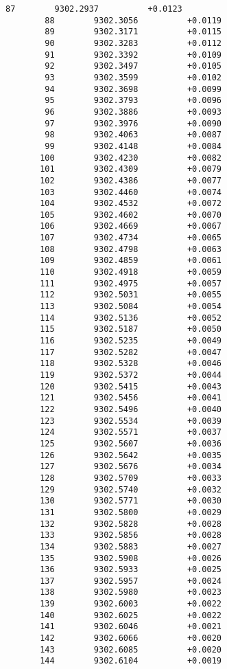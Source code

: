 \documentclass[11pt]{article}
\begin{document}
\begin{Verbatim}[commandchars=\\\{\}]
        87        9302.2937          +0.0123
        88        9302.3056          +0.0119
        89        9302.3171          +0.0115
        90        9302.3283          +0.0112
        91        9302.3392          +0.0109
        92        9302.3497          +0.0105
        93        9302.3599          +0.0102
        94        9302.3698          +0.0099
        95        9302.3793          +0.0096
        96        9302.3886          +0.0093
        97        9302.3976          +0.0090
        98        9302.4063          +0.0087
        99        9302.4148          +0.0084
       100        9302.4230          +0.0082
       101        9302.4309          +0.0079
       102        9302.4386          +0.0077
       103        9302.4460          +0.0074
       104        9302.4532          +0.0072
       105        9302.4602          +0.0070
       106        9302.4669          +0.0067
       107        9302.4734          +0.0065
       108        9302.4798          +0.0063
       109        9302.4859          +0.0061
       110        9302.4918          +0.0059
       111        9302.4975          +0.0057
       112        9302.5031          +0.0055
       113        9302.5084          +0.0054
       114        9302.5136          +0.0052
       115        9302.5187          +0.0050
       116        9302.5235          +0.0049
       117        9302.5282          +0.0047
       118        9302.5328          +0.0046
       119        9302.5372          +0.0044
       120        9302.5415          +0.0043
       121        9302.5456          +0.0041
       122        9302.5496          +0.0040
       123        9302.5534          +0.0039
       124        9302.5571          +0.0037
       125        9302.5607          +0.0036
       126        9302.5642          +0.0035
       127        9302.5676          +0.0034
       128        9302.5709          +0.0033
       129        9302.5740          +0.0032
       130        9302.5771          +0.0030
       131        9302.5800          +0.0029
       132        9302.5828          +0.0028
       133        9302.5856          +0.0028
       134        9302.5883          +0.0027
       135        9302.5908          +0.0026
       136        9302.5933          +0.0025
       137        9302.5957          +0.0024
       138        9302.5980          +0.0023
       139        9302.6003          +0.0022
       140        9302.6025          +0.0022
       141        9302.6046          +0.0021
       142        9302.6066          +0.0020
       143        9302.6085          +0.0020
       144        9302.6104          +0.0019

\end{Verbatim}
\end{document}
